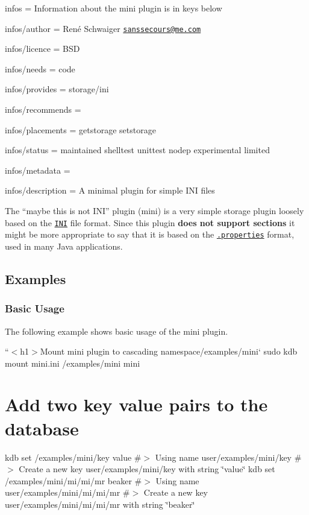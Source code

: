 
\begin{DoxyItemize}
\item infos = Information about the mini plugin is in keys below
\item infos/author = René Schwaiger \href{mailto:sanssecours@me.com}{\tt sanssecours@me.\+com}
\item infos/licence = B\+SD
\item infos/needs = code
\item infos/provides = storage/ini
\item infos/recommends =
\item infos/placements = getstorage setstorage
\item infos/status = maintained shelltest unittest nodep experimental limited
\item infos/metadata =
\item infos/description = A minimal plugin for simple I\+NI files
\end{DoxyItemize}

The “maybe this is not I\+N\+I” plugin ({\ttfamily mini}) is a very simple storage plugin loosely based on the \href{https://en.wikipedia.org/wiki/INI_file}{\tt I\+NI} file format. Since this plugin {\bfseries does not support sections} it might be more appropriate to say that it is based on the \href{https://en.wikipedia.org/wiki/.properties}{\tt .properties} format, used in many Java applications.

\subsection*{Examples}

\subsubsection*{Basic Usage}

The following example shows basic usage of the {\ttfamily mini} plugin.

``{\ttfamily  $<$h1$>$Mount mini plugin to cascading namespace}/examples/mini` sudo kdb mount mini.\+ini /examples/mini mini

\section*{Add two key value pairs to the database}

kdb set /examples/mini/key value \#$>$ Using name user/examples/mini/key \#$>$ Create a new key user/examples/mini/key with string \char`\"{}value\char`\"{} kdb set /examples/mini/mi/mi/mr beaker \#$>$ Using name user/examples/mini/mi/mi/mr \#$>$ Create a new key user/examples/mini/mi/mi/mr with string \char`\"{}beaker\char`\"{}

